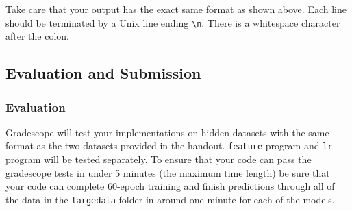 \documentclass[11pt]{exam}
\numberwithin{equation}{section} %
\numberwithin{figure}{section} %
\numberwithin{table}{section} %
\begin{document}
Take care that your output has the exact same format as shown above. Each line should be terminated by a Unix line ending \lstinline{\n}. There is a whitespace character after the colon.

\subsection{Evaluation and Submission}

\subsubsection{Evaluation}

Gradescope will test your implementations on hidden datasets with the same format as the two datasets provided in the handout. \lstinline{feature} program and \lstinline{lr} program will be tested separately. To ensure that your code can pass the gradescope tests in under 5 minutes (the maximum time length) be sure that your code can complete 60-epoch training and finish predictions through all of the data in the \lstinline{largedata} folder in around one minute for each of the models.
\end{document}

